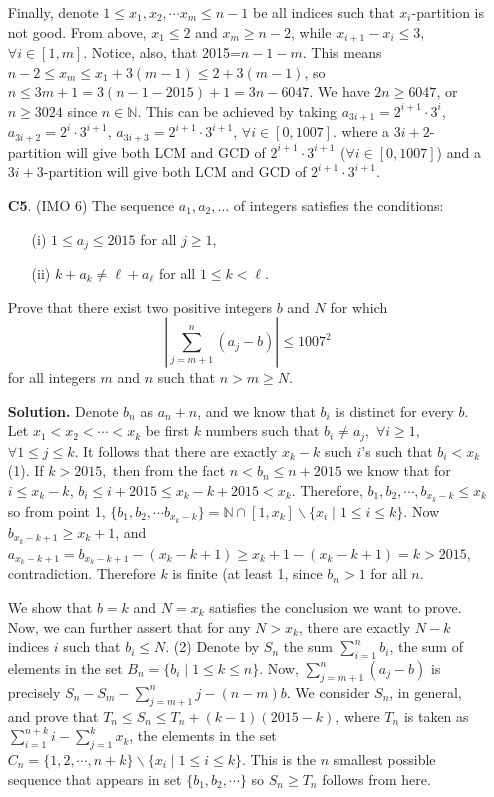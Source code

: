\documentclass[11pt,a4paper]{article}
\begin{document}
\begin{enumerate}
Finally, denote $1\le x_1, x_2,\cdots x_m\le n-1$ be all indices such that $x_i$-partition is not good. From above, $x_1\le 2$ and $x_m\ge n-2$, while $x_{i+1}-x_{i}\le 3$, $\forall i\in [1,m]$. Notice, also, that 2015=$n-1-m$. This means $n-2\le x_m\le x_1+3(m-1)\le 2+3(m-1)$, so $n\le 3m+1=3(n-1-2015)+1=3n-6047$. We have $2n\ge 6047$, or $n\ge 3024$ since $n\in\mathbb{N}$. This can be achieved by taking $a_{3i+1}=2^{i+1}\cdot 3^{i}$, $a_{3i+2}=2^{i}\cdot 3^{i+1}$, $a_{3i+3}=2^{i+1}\cdot 3^{i+1}$, $\forall i\in[0,1007]$. where a $3i+2$-partition will give both LCM and GCD of $2^{i+1}\cdot 3^{i+1}$ ($\forall i\in [0,1007]$) and a $3i+3$-partition will give both LCM and GCD of $2^{i+1}\cdot 3^{i+1}$.

\item[\textbf{C5}.] (IMO 6) The sequence $a_1,a_2,\dots$ of integers satisfies the conditions:

\begin{enumerate}
	\item [(i)] $1\le a_j\le2015$ for all $j\ge1$,
	\item [(ii)] $k+a_k\neq \ell+a_\ell$ for all $1\le k<\ell$.
\end{enumerate}

Prove that there exist two positive integers $b$ and $N$ for which\[\left\vert\sum_{j=m+1}^n(a_j-b)\right\vert\le1007^2\]for all integers $m$ and $n$ such that $n>m\ge N$.

\textbf{Solution.} Denote $b_n$ as $a_n+n$, and we know that $b_i$ is distinct for every $b$. Let $x_1< x_2<\cdots <x_k$ be first $k$ numbers such that $b_i\ne a_j,$ $\forall i\ge 1,$ $\forall1\le j\le k$. It follows that there are exactly $x_k-k$ such $i$'s such that $b_i<x_k$ (1). If $k>2015,$ then from the fact $n<b_n\le n+2015$ we know that for $i\le x_k-k$, $b_i\le i+2015\le x_k-k+2015<x_k$. Therefore, $b_1, b_2,\cdots ,b_{x_k-k}\le x_k$ so from point 1, $\{b_1, b_2,\cdots b_{x_k-k}\}=\mathbb{N}\cap [1, x_k]\backslash \{x_i\mid 1\le i\le k\}$. Now $b_{x_k-k+1}\ge x_k+1$, and $a_{x_k-k+1}=b_{x_k-k+1}-(x_k-k+1)\ge x_k+1-(x_k-k+1)=k>2015$, contradiction. Therefore $k$ is finite (at least 1, since $b_n>1$ for all $n$.

We show that $b=k$ and $N=x_k$ satisfies the conclusion we want to prove. Now, we can further assert that for any $N>x_k$, there are exactly $N-k$ indices $i$ such that $b_i\le N$. (2) Denote by $S_n$ the sum $\sum_{i=1}^{n} b_i$, the sum of elements in the set $B_n=\{b_i\mid 1\le k\le n\}$. Now, $\sum_{j=m+1}^n(a_j-b)$ is precisely $S_n-S_m-\sum_{j=m+1}^n j-(n-m)b$. We consider $S_n$, in general, and prove that $T_n\le S_n\le T_n+(k-1)(2015-k)$, where $T_n$ is taken as $\sum_{i=1}^{n+k} i-\sum_{j=1}^{k} x_k$, the elements in the set $C_n=\{1,2,\cdots, n+k\}\backslash \{x_i\mid 1\le i\le k\}$. This is the $n$ smallest possible sequence that appears in set $\{b_1, b_2,\cdots \}$ so $S_n\ge T_n$ follows from here.


\end{enumerate}
\end{document}

